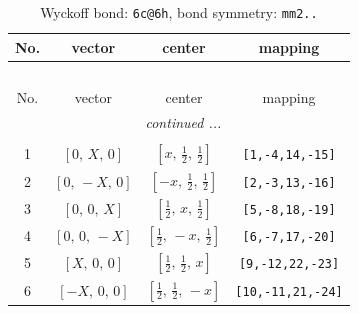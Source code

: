\documentclass[fleqn,8pt]{jsarticle}
\begin{document}
\begin{longtable}{cccc}
\caption{Wyckoff bond: {\tt 6c@6h}, bond symmetry: {\tt mm2..}}
 \\
 \hline \hline
No. & vector & center & mapping \\ \hline \endfirsthead

\multicolumn{3}{l}{\tablename\ \thetable{}} \\
 \hline \hline
No. & vector & center & mapping \\ \hline \endhead

 \hline \hline
\multicolumn{3}{r}{\footnotesize\it continued ...} \\ \endfoot

 \hline \hline
\multicolumn{3}{r}{} \\ \endlastfoot

1 & $\left[ 0,\, X,\, 0 \right]$ & $\left[ x,\, \frac{1}{2},\, \frac{1}{2} \right]$ & {\tt [1,-4,14,-15]} \\ \hline
2 & $\left[ 0,\, - X,\, 0 \right]$ & $\left[ - x,\, \frac{1}{2},\, \frac{1}{2} \right]$ & {\tt [2,-3,13,-16]} \\ \hline
3 & $\left[ 0,\, 0,\, X \right]$ & $\left[ \frac{1}{2},\, x,\, \frac{1}{2} \right]$ & {\tt [5,-8,18,-19]} \\ \hline
4 & $\left[ 0,\, 0,\, - X \right]$ & $\left[ \frac{1}{2},\, - x,\, \frac{1}{2} \right]$ & {\tt [6,-7,17,-20]} \\ \hline
5 & $\left[ X,\, 0,\, 0 \right]$ & $\left[ \frac{1}{2},\, \frac{1}{2},\, x \right]$ & {\tt [9,-12,22,-23]} \\ \hline
6 & $\left[ - X,\, 0,\, 0 \right]$ & $\left[ \frac{1}{2},\, \frac{1}{2},\, - x \right]$ & {\tt [10,-11,21,-24]} \\
\end{longtable}
\renewcommand{\arraystretch}{1.2}
\end{document}
